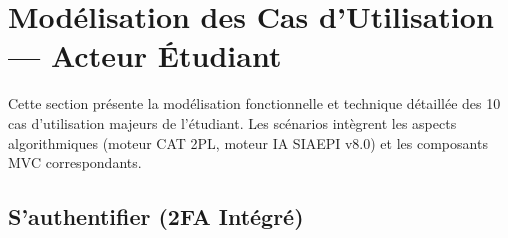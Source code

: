 %
%
%
%

\section{Modélisation des Cas d'Utilisation --- Acteur Étudiant}
Cette section présente la modélisation fonctionnelle et technique détaillée des 10 cas d'utilisation majeurs de l'étudiant. Les scénarios intègrent les aspects algorithmiques (moteur CAT 2PL, moteur IA SIAEPI v8.0) et les composants MVC correspondants.

\subsection{S'authentifier (2FA Intégré)}

